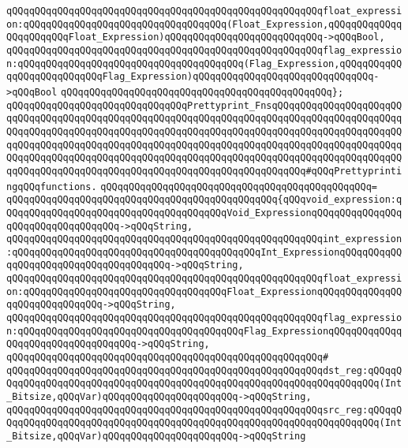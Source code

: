 \verb|qQQqqQQqqQQqqQQqqQQqqQQqqQQqqQQqqQQqqQQqqQQqqQQqqQQqqQQqfloat_expression:qQQqqQQqqQQqqQQqqQQqqQQqqQQqqQQqqQQq(Float_Expression,qQQqqQQqqQQqqQQqqQQqqQQqFloat_Expression)qQQqqQQqqQQqqQQqqQQqqQQqqQQq->qQQqBool,|\newline
\verb|qQQqqQQqqQQqqQQqqQQqqQQqqQQqqQQqqQQqqQQqqQQqqQQqqQQqqQQqflag_expression:qQQqqQQqqQQqqQQqqQQqqQQqqQQqqQQqqQQqqQQq(Flag_Expression,qQQqqQQqqQQqqQQqqQQqqQQqqQQqFlag_Expression)qQQqqQQqqQQqqQQqqQQqqQQqqQQqqQQq->qQQqBool|\newline
\verb|qQQqqQQqqQQqqQQqqQQqqQQqqQQqqQQqqQQqqQQqqQQqqQQq};|\newline
\newline
\verb|qQQqqQQqqQQqqQQqqQQqqQQqqQQqqQQqPrettyprint_FnsqQQqqQQqqQQqqQQqqQQqqQQqqQQqqQQqqQQqqQQqqQQqqQQqqQQqqQQqqQQqqQQqqQQqqQQqqQQqqQQqqQQqqQQqqQQqqQQqqQQqqQQqqQQqqQQqqQQqqQQqqQQqqQQqqQQqqQQqqQQqqQQqqQQqqQQqqQQqqQQqqQQqqQQqqQQqqQQqqQQqqQQqqQQqqQQqqQQqqQQqqQQqqQQqqQQqqQQqqQQqqQQqqQQqqQQqqQQqqQQqqQQqqQQqqQQqqQQqqQQqqQQqqQQqqQQqqQQqqQQqqQQqqQQqqQQqqQQqqQQqqQQqqQQqqQQqqQQqqQQqqQQqqQQqqQQqqQQqqQQqqQQqqQQqqQQqqQQq#qQQqPrettyprintingqQQqfunctions.|\newline
\verb|qQQqqQQqqQQqqQQqqQQqqQQqqQQqqQQqqQQqqQQqqQQqqQQq=|\newline
\verb|qQQqqQQqqQQqqQQqqQQqqQQqqQQqqQQqqQQqqQQqqQQqqQQq{qQQqvoid_expression:qQQqqQQqqQQqqQQqqQQqqQQqqQQqqQQqqQQqqQQqVoid_ExpressionqQQqqQQqqQQqqQQqqQQqqQQqqQQqqQQqqQQq->qQQqString,|\newline
\verb|qQQqqQQqqQQqqQQqqQQqqQQqqQQqqQQqqQQqqQQqqQQqqQQqqQQqqQQqint_expression:qQQqqQQqqQQqqQQqqQQqqQQqqQQqqQQqqQQqqQQqqQQqInt_ExpressionqQQqqQQqqQQqqQQqqQQqqQQqqQQqqQQqqQQqqQQq->qQQqString,|\newline
\verb|qQQqqQQqqQQqqQQqqQQqqQQqqQQqqQQqqQQqqQQqqQQqqQQqqQQqqQQqfloat_expression:qQQqqQQqqQQqqQQqqQQqqQQqqQQqqQQqqQQqFloat_ExpressionqQQqqQQqqQQqqQQqqQQqqQQqqQQqqQQq->qQQqString,|\newline
\verb|qQQqqQQqqQQqqQQqqQQqqQQqqQQqqQQqqQQqqQQqqQQqqQQqqQQqqQQqflag_expression:qQQqqQQqqQQqqQQqqQQqqQQqqQQqqQQqqQQqqQQqFlag_ExpressionqQQqqQQqqQQqqQQqqQQqqQQqqQQqqQQqqQQq->qQQqString,|\newline
\verb|qQQqqQQqqQQqqQQqqQQqqQQqqQQqqQQqqQQqqQQqqQQqqQQqqQQqqQQq#|\newline
\verb|qQQqqQQqqQQqqQQqqQQqqQQqqQQqqQQqqQQqqQQqqQQqqQQqqQQqqQQqdst_reg:qQQqqQQqqQQqqQQqqQQqqQQqqQQqqQQqqQQqqQQqqQQqqQQqqQQqqQQqqQQqqQQqqQQqqQQq(Int_Bitsize,qQQqVar)qQQqqQQqqQQqqQQqqQQqqQQq->qQQqString,|\newline
\verb|qQQqqQQqqQQqqQQqqQQqqQQqqQQqqQQqqQQqqQQqqQQqqQQqqQQqqQQqsrc_reg:qQQqqQQqqQQqqQQqqQQqqQQqqQQqqQQqqQQqqQQqqQQqqQQqqQQqqQQqqQQqqQQqqQQqqQQq(Int_Bitsize,qQQqVar)qQQqqQQqqQQqqQQqqQQqqQQq->qQQqString|\newline
